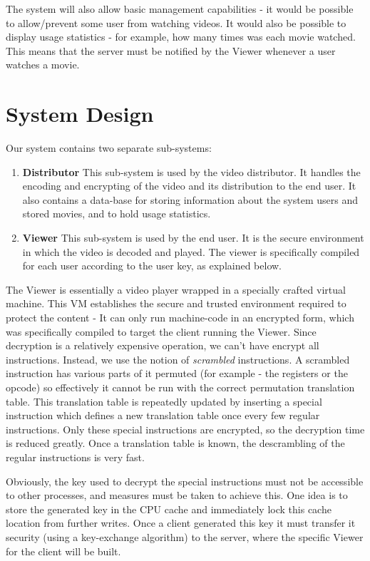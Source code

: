 \documentclass[conference]{IEEEtran}
\begin{document}
The system will also allow basic management capabilities - it would be
possible to allow/prevent some user from watching videos. It would also
be possible to display usage statistics - for example, how many times
was each movie watched. This means that the server must be notified by
the Viewer whenever a user watches a movie.

\section{System Design} 
Our system contains two separate sub-systems: 
\begin{enumerate} 
    \item \textbf{Distributor} 
        This sub-system is used by the video distributor. It handles the
        encoding and encrypting of the video and its distribution to the end
        user. It also contains a data-base for storing information about the
        system users and stored movies, and to hold usage statistics.
    \item \textbf{Viewer} 
        This sub-system is used by the end user. It is the secure
        environment in which the video is decoded and played. The viewer
        is specifically compiled for each user according to the user
        key, as explained below.
\end{enumerate}

The Viewer is essentially a video player wrapped in a specially crafted
virtual machine. This VM establishes the secure and trusted environment
required to protect the content - It can only run machine-code in
an encrypted form, which was specifically compiled to target the
client running the Viewer. Since decryption is a relatively expensive
operation, we can't have encrypt all instructions. Instead, we use
the notion of \emph{scrambled} instructions. A scrambled instruction
has various parts of it permuted (for example - the registers or the opcode)
so effectively it cannot be run with the correct permutation translation table.
This translation table is repeatedly updated by inserting a special
instruction which defines a new translation table once every few regular
instructions. Only these special instructions are encrypted, so the
decryption time is reduced greatly. Once a translation table is known,
the descrambling of the regular instructions is very fast.

Obviously, the key used to decrypt the special instructions must not be
accessible to other processes, and measures must be taken to achieve
this. One idea is to store the generated key in the CPU cache and
immediately lock this cache location from further writes. Once a client
generated this key it must transfer it security (using a key-exchange
algorithm) to the server, where the specific Viewer for the client will
be built.
\end{document}
